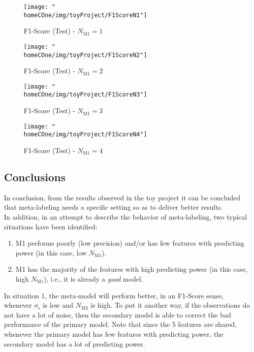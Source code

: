 \documentclass[a4paper]{report}
\newcommand{\homeCOne}{../../Chapter 1 - Metalabeling/Draft}
\begin{document}
\begin{figure}[htbp]
\centering
	\begin{minipage}{.5\textwidth}
	\centering
		\texttt{[image: "\\homeCOne/img/toyProject/F1ScoreN1"]}
	  	\caption{F1-Score (Test) - $N_{\text{M1}} = 1$}
	  	\label{fig:F1ScoreN1}
	\end{minipage}%
	\begin{minipage}{.5\textwidth}
	\centering
		\texttt{[image: "\\homeCOne/img/toyProject/F1ScoreN2"]}
		\caption{F1-Score (Test) - $N_{\text{M1}} = 2$}
		\label{fig:F1ScoreN2}
	\end{minipage}

	\vspace{.5cm}

	\begin{minipage}{.5\textwidth}
	\centering
		\texttt{[image: "\\homeCOne/img/toyProject/F1ScoreN3"]}
		\caption{F1-Score (Test) - $N_{\text{M1}} = 3$}
		\label{fig:F1ScoreN3}
	\end{minipage}%
	\begin{minipage}{.5\textwidth}
	\centering
		\texttt{[image: "\\homeCOne/img/toyProject/F1ScoreN4"]}
		\caption{F1-Score (Test) - $N_{\text{M1}} = 4$}
		\label{fig:F1ScoreN4}
	\end{minipage}
\end{figure}

\newpage

\subsection{Conclusions}
In conclusion, from the results observed in the toy project it can be 
concluded that meta-labeling needs a specific setting so as to deliver better 
results.\\

In addition, in an attempt to describe the behavior of meta-labeling, two 
typical situations have been identified:
\begin{enumerate}
	\item M1 performs poorly (low precision) and/or has few features
	with predicting 	power (in this case, low $N_{\text{M1}}$).
	
	\item M1 has the majority of the features with high predicting 
	power (in this case, high $N_{\text{M1}}$), i.e., it is already a 
	\textit{good} model.
\end{enumerate}

In situation 1, the meta-model will perform better, in an F1-Score sense, 
whenever $\sigma_\epsilon$ is low and $N_{\text{M2}}$ is high. To put it 
another way, if the observations do not have a lot of noise, then the 
secondary model is able to correct the bad performance of the primary model. 
Note that since the 5 features are shared, whenever the primary model has few 
features with predicting power, the secondary model has a lot of predicting 
power.\\
\end{document}

